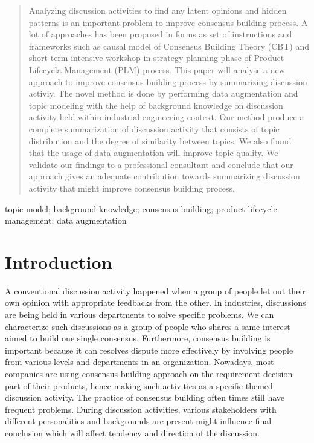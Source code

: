 \documentclass[10pt, conference, compsocconf]{IEEEtran}
\begin{document}
\begin{abstract}
Analyzing discussion activities to find any latent opinions and hidden patterns is an important problem to improve consensus building process. A lot of approaches has been proposed in forms as set of instructions and frameworks such as causal model of Consensus Building Theory (CBT) and short-term intensive workshop in strategy planning phase of Product Lifecycla Management (PLM) process. This paper will analyse a new approach to improve consensus building process by summarizing discussion activiy. The novel method is done by performing data augmentation and topic modeling with the help of background knowledge on discussion activity held within industrial engineering context. Our method produce a complete summarization of discussion activity that consists of topic distribution and the degree of similarity between topics. We also found that the usage of data augmentation will improve topic quality. We validate our findings to a professional consultant and conclude that our approach gives an adequate contribution towards summarizing discussion activity that might improve consensus building process.
\end{abstract}

\begin{IEEEkeywords}
topic model; background knowledge; consensus building; product lifecycle management; data augmentation

\end{IEEEkeywords}


%
\IEEEpeerreviewmaketitle



\section{Introduction}
A conventional discussion activity happened when a group of people let out their own opinion with appropriate feedbacks from the other. In industries, discussions are being held in various departments to solve specific problems. We can characterize such discussions as a group of people who shares a same interest aimed to build one single consensus. Furthermore, consensus building is important because it can resolves dispute more effectively by involving people from various levels and departments in an organization\cite{b1}. Nowadays, most companies are using consensus building approach on the requirement decision part of their products, hence making such activities as a specific-themed discussion activity. The practice of consensus building often times still have frequent problems. During discussion activities, various stakeholders with different personalities and backgrounds are present might influence final conclusion\cite{b2} which will affect tendency and direction of the discussion\cite{b3}.
 
\end{document}
